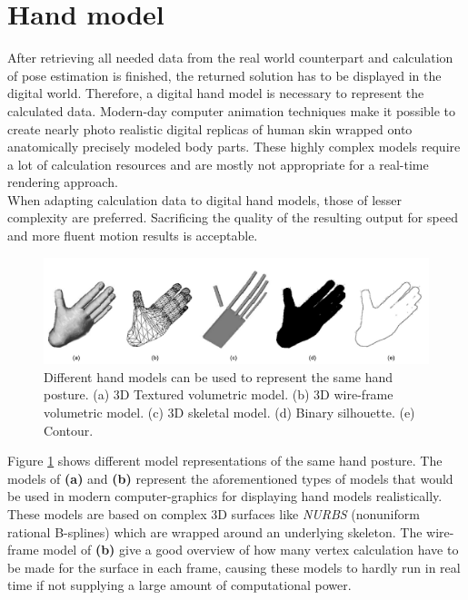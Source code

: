 \section{Hand model}
After retrieving all needed data from the real world counterpart and calculation of pose estimation is finished, the returned solution has to be displayed in the digital world. Therefore, a digital hand model is necessary to represent the calculated data. Modern-day computer animation techniques make it possible to create nearly photo realistic digital replicas of human skin wrapped onto anatomically precisely modeled body parts. These highly complex models require a lot of calculation resources and are mostly not appropriate for a real-time rendering approach.\\
When adapting calculation data to digital hand models, those of lesser complexity are preferred. Sacrificing the quality of the resulting output for speed and more fluent motion results is acceptable.
\begin{figure}[H]
\includegraphics[width=\textwidth]{images/Pavlovic-Sharmaetal.jpg}
\caption{Different hand models can be used to represent the same hand posture. (a) 3D Textured volumetric model. (b) 3D wire-frame volumetric model. (c) 3D skeletal model. (d) Binary silhouette. (e) Contour. ~\cite[p.~682]{Pavlovic.1997}}

\label{handmodels_detail_level}
\end{figure}
Figure \ref{handmodels_detail_level} shows different model representations of the same hand posture. The models of \textbf{(a)} and \textbf{(b)} represent the aforementioned types of models that would be used in modern computer-graphics for displaying hand models realistically.\\These models are based on complex 3D surfaces like \textit{NURBS} (nonuniform rational B-splines) which are wrapped around an underlying skeleton. The wire-frame model of \textbf{(b)} give a good overview of how many vertex calculation have to be made for the surface in each frame, causing these models to hardly run in real time if not supplying a large amount of computational power.\\
